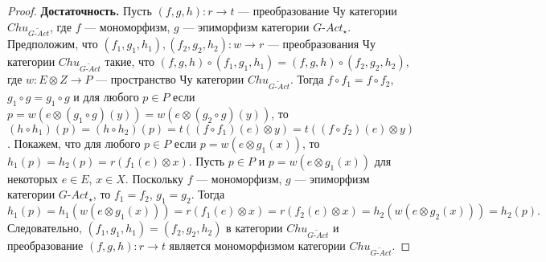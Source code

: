 \documentclass[a4paper,12pt]{article}
\newcommand{\GAct}{G\text{-}Act}
\begin{document}
\begin{proof}
    \textbf{Достаточность.} Пусть $(f,g,h): r \to t$ --- преобразование Чу категории $Chu_{\widetilde{\GAct}}$, где $f$ --- мономорфизм, $g$ --- эпиморфизм категории $\GAct_{\star}$. Предположим, что $(f_1,g_1,h_1), (f_2,g_2,h_2): w \to r$ --- преобразования Чу категории $Chu_{\widetilde{\GAct}}$ такие, что $(f,g,h) \circ (f_1,g_1,h_1) = (f,g,h) \circ (f_2,g_2,h_2)$, где $w: E \otimes Z \to P$ --- пространство Чу категории $Chu_{\widetilde{\GAct}}$. Тогда $f \circ f_1 = f \circ f_2$, $g_1 \circ g = g_1 \circ g$ и для любого $p \in P$ если $p = w(e \otimes (g_1 \circ g)(y)) = w(e \otimes (g_2 \circ g)(y))$, то $(h \circ h_1)(p) = (h \circ h_2)(p) = t((f \circ f_1)(e) \otimes y) = t((f \circ f_2)(e) \otimes y)$. Покажем, что для любого $p \in P$ если $p = w(e \otimes g_1(x))$, то $h_1(p) = h_2(p) = r(f_1(e) \otimes x)$. Пусть $p \in P$ и $p = w(e \otimes g_1(x))$ для некоторых $e \in E$, $x \in X$. Поскольку $f$ --- мономорфизм, $g$ --- эпиморфизм категории $\GAct_{\star}$, то $f_1 = f_2$, $g_1 = g_2$. Тогда 
    $$
        h_1(p) = h_1(w(e \otimes g_1(x))) = r(f_1(e) \otimes x) = r(f_2(e) \otimes x) = h_2(w(e \otimes g_2(x))) = h_2(p).
    $$
    Следовательно, $(f_1,g_1,h_1) = (f_2,g_2,h_2)$ в категории $Chu_{\widetilde{\GAct}}$ и преобразование $(f,g,h): r \to t$ является мономорфизмом категории $Chu_{\widetilde{\GAct}}$.
\end{proof}
\end{document}
